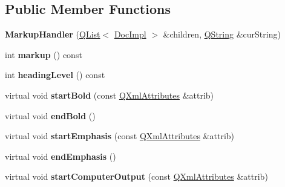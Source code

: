 \subsection*{Public Member Functions}
\begin{DoxyCompactItemize}
\item 
\mbox{\label{class_markup_handler_a2779b00d597b8e3dc4bc0492a4e31c02}} 
{\bfseries Markup\+Handler} (\mbox{\hyperlink{class_q_list}{Q\+List}}$<$ \mbox{\hyperlink{class_doc_impl}{Doc\+Impl}} $>$ \&children, \mbox{\hyperlink{class_q_string}{Q\+String}} \&cur\+String)
\item 
\mbox{\label{class_markup_handler_aa1456ca99fe8f9eda6e37e22f91922b8}} 
int {\bfseries markup} () const
\item 
\mbox{\label{class_markup_handler_ad8c64762b04e595607bfbc7edabfeb20}} 
int {\bfseries heading\+Level} () const
\item 
\mbox{\label{class_markup_handler_afca0a2b1078d41b5031b1562b2674b42}} 
virtual void {\bfseries start\+Bold} (const \mbox{\hyperlink{class_q_xml_attributes}{Q\+Xml\+Attributes}} \&attrib)
\item 
\mbox{\label{class_markup_handler_ade017bb597346494bd6da7d7642ea33b}} 
virtual void {\bfseries end\+Bold} ()
\item 
\mbox{\label{class_markup_handler_ac1bfec64b91df892213a65ba45d0e87f}} 
virtual void {\bfseries start\+Emphasis} (const \mbox{\hyperlink{class_q_xml_attributes}{Q\+Xml\+Attributes}} \&attrib)
\item 
\mbox{\label{class_markup_handler_a2a1613f12a7661c9555d679ca29264eb}} 
virtual void {\bfseries end\+Emphasis} ()
\item 
\mbox{\label{class_markup_handler_a471c0bdb52b752560c8e398f0184a6bb}} 
virtual void {\bfseries start\+Computer\+Output} (const \mbox{\hyperlink{class_q_xml_attributes}{Q\+Xml\+Attributes}} \&attrib)
\item 
\mbox{\label{class_markup_handler_a4041d6dcad8e3e3d7abb53b89b1471f2}} 

\end{DoxyCompactItemize}
